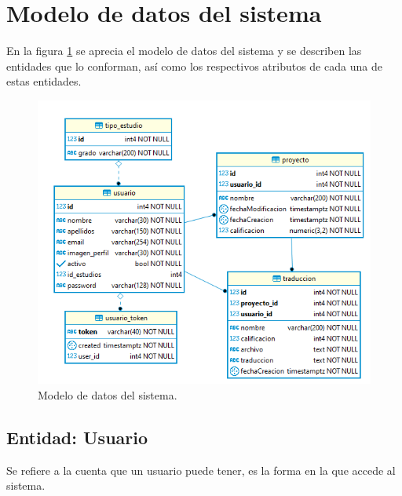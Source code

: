 \section{Modelo de datos del sistema}
En la figura \ref{fig:db} se aprecia el modelo de datos del sistema y se describen las entidades que lo conforman, así como los respectivos atributos de cada una de estas entidades.
\begin{figure}[h]
	\centering
	\includegraphics[width=\textwidth]{capitulo4/imagenes/tt_base.png}
	\caption{Modelo de datos del sistema.}
	\label{fig:db}
\end{figure}

\subsection{Entidad: Usuario}
Se refiere a la cuenta que un usuario puede tener, es la forma en la que accede al sistema.
